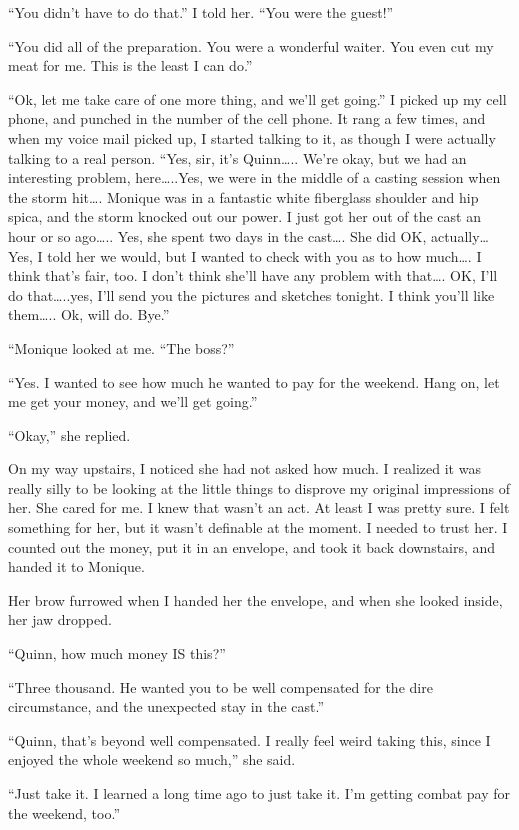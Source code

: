 ``You didn't have to do that.'' I told her. ``You were the guest!''

``You did all of the preparation. You were a wonderful waiter. You even cut my meat for
me. This is the least I can do.''

``Ok, let me take care of one more thing, and we'll get going.'' I picked up my cell
phone, and punched in the number of the cell phone. It rang a few times, and when my voice mail
picked up, I started talking to it, as though I were actually talking to a real person. ``Yes,
sir, it's Quinn….. We're okay, but we had an interesting problem, here…..Yes, we were in the
middle of a casting session when the storm hit…. Monique was in a fantastic white fiberglass
shoulder and hip spica, and the storm knocked out our power. I just got her out of the cast an
hour or so ago….. Yes, she spent two days in the cast…. She did OK, actually…Yes, I told her we
would, but I wanted to check with you as to how much…. I think that's fair, too. I don't think
she'll have any problem with that…. OK, I'll do that…..yes, I'll send you the pictures and
sketches tonight. I think you'll like them….. Ok, will do. Bye.''

``Monique looked at me. ``The boss?''

``Yes. I wanted to see how much he wanted to pay for the weekend. Hang on, let me get your
money, and we'll get going.''

``Okay,'' she replied.

On my way upstairs, I noticed she had not asked how much. I realized it was really silly
to be looking at the little things to disprove my original impressions of her. She cared for me.
I knew that wasn't an act. At least I was pretty sure. I felt something for her, but it wasn't
definable at the moment. I needed to trust her. I counted out the money, put it in an envelope,
and took it back downstairs, and handed it to Monique.

Her brow furrowed when I handed her the envelope, and when she looked inside, her jaw
dropped.

``Quinn, how much money IS this?''

``Three thousand. He wanted you to be well compensated for the dire circumstance, and the
unexpected stay in the cast.''

``Quinn, that's beyond well compensated. I really feel weird taking this, since I enjoyed
the whole weekend so much,'' she said.

``Just take it. I learned a long time ago to just take it. I'm getting combat pay for the
weekend, too.''

